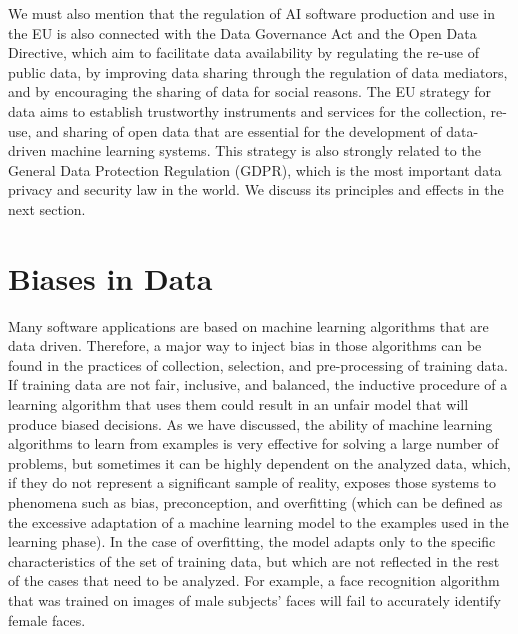 We must also mention that the regulation of AI software production and use in the EU is also connected with the Data Governance Act and the Open Data Directive, which aim to facilitate data availability by regulating the re-use of public data, by improving data sharing through the regulation of data mediators, and by encouraging the sharing of data for social reasons. The EU strategy for data aims to establish trustworthy instruments and services for the collection, re-use, and sharing of open data that are essential for the development of data-driven machine learning systems. This strategy is also strongly related to the General Data \hbox{Protection} Regulation (GDPR), which is the most important data privacy and security law in the world. We discuss its principles and effects in the next section.

\section{\label{sec:7.5}Biases in Data}

Many software
applications are based on machine learning algorithms that are data driven. Therefore, a major way to inject bias in those algorithms can be found in the practices of collection, selection, and pre-processing of training data. If training data are not fair, inclusive, and balanced, the inductive procedure of a learning algorithm that uses them could result in an unfair model that will produce biased decisions. As we have discussed, the ability of machine learning algorithms to learn from examples is very effective for solving a large number of problems, but sometimes it can be highly dependent on the analyzed data, which, if they do not represent a significant sample of reality, exposes those systems to phenomena such as bias, preconception, and overfitting (which can be defined as the excessive adaptation of a machine learning model to the examples used in the learning phase). In the case of overfitting, the model adapts only to the specific characteristics of the set of training data, but which are not reflected in the rest of the cases that need to be analyzed. For example, a face recognition algorithm that was trained on images of male subjects' faces will fail to accurately identify female faces.

